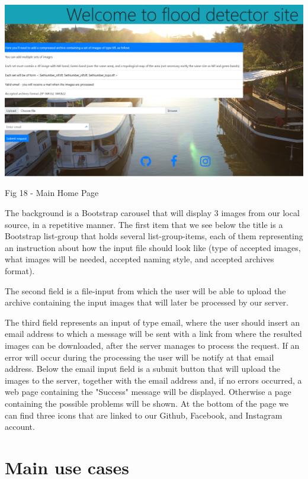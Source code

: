 \documentclass[12pt, a4paper]{report}
\begin{document}
\bigskip
\includegraphics[scale=0.4, center]{gui_homepage.png}
\begin{center}
Fig 18 - Main Home Page 
\end{center}
\par 

The background is a Bootstrap carousel that will display 3 images from our local source, in a repetitive manner. The first item that we see below the title is a Bootstrap list-group that holds several list-group-items, each of them representing an instruction about how the input file should look like (type of accepted images, what images will be needed, accepted naming style, and accepted archives format).
\par 

The second field is a file-input from which the user will be able to upload the archive containing the input images that will later be processed by our server.
\par 

The third field represents an input of type email, where the user should insert an email address to which a message will be sent with a link from where the resulted images can be downloaded, after the server manages to process the request. If an error will occur during the processing the user will be notify at that email address. Below the email input field is a submit button that will upload the images to the server, together with the email address and, if no errors occurred, a web page containing the "Success" message will be displayed. Otherwise a page containing the possible problems will be shown. At the bottom of the page we can find three icons that are linked to our Github, Facebook, and Instagram account.



\section{Main use cases}
\end{document}
